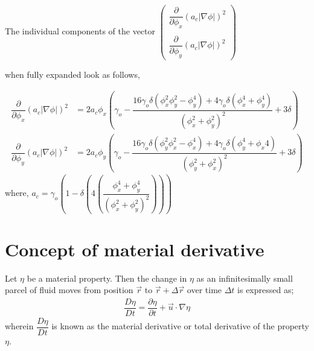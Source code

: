 \documentclass[12pt,a4paper]{report}
\begin{document}
\begin{mdframed}[style=MyFrame]
The individual components of the vector 
$\begin{pmatrix}
	\dfrac{\partial}{\partial \phi_x}\left(a_c|\nabla\phi|\right)^2\\
	\\
	\dfrac{\partial}{\partial \phi_y}\left(a_c|\nabla\phi|\right)^2
\end{pmatrix}$

when fully expanded look as follows,

\begin{align}
 \dfrac{\partial}{\partial \phi_x}\left(a_c|\nabla\phi|\right)^2 &= 2a_c\phi_x\left(\gamma_o - \dfrac{16\gamma_o\delta\left(\phi_x^2\phi_y^2 - \phi_y^4\right)+4\gamma_o\delta\left(\phi_x^4+\phi_y^4\right)}
 {\left(\phi_x^2+\phi_y^2\right)^2} + 3\delta\right)\\ 
 \dfrac{\partial}{\partial \phi_y}\left(a_c|\nabla\phi|\right)^2 &= 2a_c\phi_y\left(\gamma_o - \dfrac{16\gamma_o\delta\left(\phi_y^2\phi_x^2 - \phi_x^4\right)+4\gamma_o\delta\left(\phi_y^4+\phi_x4\right)}
 {\left(\phi_y^2+\phi_x^2\right)^2} + 3\delta\right)
\end{align}
where, $ a_c = \gamma_o\left(1 - \delta\left(4\left(\dfrac{\phi_x^4+\phi_y^4}{\left(\phi_x^2+\phi_y^2\right)^2}\right)\right)\right)$
\end{mdframed}

\section{Concept of material derivative}
	Let $\eta$ be a material property. Then the change in $\eta$ as an infinitesimally small parcel of fluid moves from position $\vec{r}$ to $\vec{r}+\Delta \vec{r}$ over time $\Delta t$ is expressed as;
	\begin{align}
		\dfrac{D\eta}{Dt} = \dfrac{\partial \eta}{\partial t} + \vec{u}\cdot\nabla\eta
	\end{align}
	wherein $\dfrac{D\eta}{Dt}$ is known as the material derivative or total derivative of the property $\eta$. 
	
\end{document}

